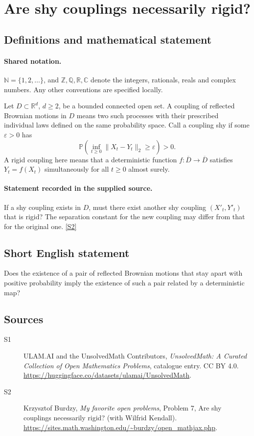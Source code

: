 \documentclass[11pt]{article}
\newcommand{\sref}[2]{\hyperlink{source:#1:#2}{[S#2]}}
\begin{document}
\section{Are shy couplings necessarily rigid?}\label{statement}

\subsection{Definitions and mathematical statement}

\paragraph{Shared notation.}$\mathbb N=\{1,2,\ldots\}$, and $\mathbb Z,\mathbb Q,\mathbb R,\mathbb C$ denote the integers, rationals, reals and complex numbers. Any other conventions are specified locally.


Let $D\subset\mathbb R^d$, $d\ge2$, be a bounded connected open set. A coupling of reflected Brownian motions in $D$ means two such processes with their prescribed individual laws defined on the same probability space. Call a coupling shy if some $\varepsilon>0$ has
\[\mathbb P\left(\inf_{t\ge0}\|X_t-Y_t\|_2\ge\varepsilon\right)>0.\]
A rigid coupling here means that a deterministic function $f:\overline D\to\overline D$ satisfies $Y_t=f(X_t)$ simultaneously for all $t\ge0$ almost surely.
\paragraph{Statement recorded in the supplied source.}
If a shy coupling exists in $D$, must there exist another shy coupling $(X'_t,Y'_t)$ that is rigid? The separation constant for the new coupling may differ from that for the original one. \sref{statement}{2}
\subsection{Short English statement}
Does the existence of a pair of reflected Brownian motions that stay apart with positive probability imply the existence of such a pair related by a deterministic map?
\subsection{Sources}
\begin{description}
\item[\hypertarget{source:statement:1}{S1}] ULAM.AI and the UnsolvedMath Contributors, \emph{UnsolvedMath: A Curated Collection of Open Mathematics Problems}, catalogue entry. CC BY 4.0. \url{https://huggingface.co/datasets/ulamai/UnsolvedMath}.
\item[\hypertarget{source:statement:2}{S2}] Krzysztof Burdzy, \emph{My favorite open problems}, Problem 7, Are shy couplings necessarily rigid? (with Wilfrid Kendall). \url{https://sites.math.washington.edu/~burdzy/open_mathjax.php}.
\end{description}
\label{end:statement}
\end{document}
